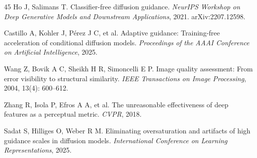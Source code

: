 \documentclass[times,twocolumn,final]{elsarticle}
\begin{document}
\begin{thebibliography}{45}
Ho J, Salimans T. Classifier-free diffusion guidance. \textit{NeurIPS Workshop on Deep Generative Models and Downstream Applications}, 2021. arXiv:2207.12598.

Castillo A, Kohler J, P\'erez J C, et al. Adaptive guidance: Training-free acceleration of conditional diffusion models. \textit{Proceedings of the AAAI Conference on Artificial Intelligence}, 2025.

Wang Z, Bovik A C, Sheikh H R, Simoncelli E P. Image quality assessment: From error visibility to structural similarity. \textit{IEEE Transactions on Image Processing}, 2004, 13(4): 600--612.

Zhang R, Isola P, Efros A A, et al. The unreasonable effectiveness of deep features as a perceptual metric. \textit{CVPR}, 2018.

Sadat S, Hilliges O, Weber R M. Eliminating oversaturation and artifacts of high guidance scales in diffusion models. \textit{International Conference on Learning Representations}, 2025.

\end{thebibliography}
\endgroup
\end{document}
